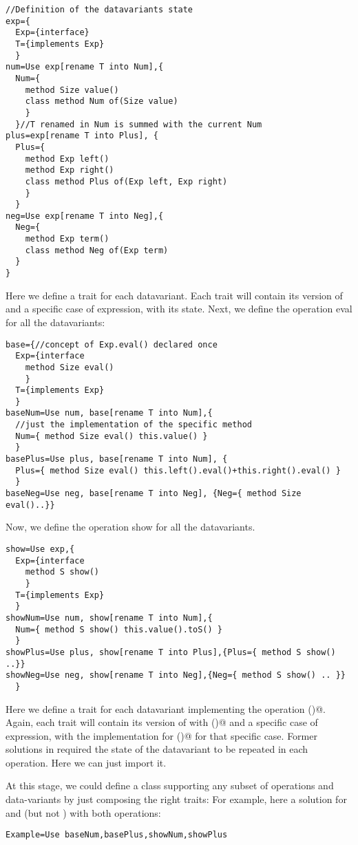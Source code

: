 \begin{lstlisting}
//Definition of the datavariants state
exp={
  Exp={interface}
  T={implements Exp}
  }
num=Use exp[rename T into Num],{
  Num={
    method Size value()
    class method Num of(Size value)
    }
  }//T renamed in Num is summed with the current Num
plus=exp[rename T into Plus], {
  Plus={
    method Exp left()
    method Exp right()
    class method Plus of(Exp left, Exp right)
    }
  }
neg=Use exp[rename T into Neg],{
  Neg={
    method Exp term()
    class method Neg of(Exp term)
  }
}
\end{lstlisting}
Here we define a trait for each datavariant.
Each trait will contain its version of \Q@Exp@
and a specific case of expression, with its state.
Next, we define the operation eval for all the datavariants:
\begin{lstlisting}
base={//concept of Exp.eval() declared once
  Exp={interface
    method Size eval()
    }
  T={implements Exp}
  }
baseNum=Use num, base[rename T into Num],{
  //just the implementation of the specific method
  Num={ method Size eval() this.value() }
  }
basePlus=Use plus, base[rename T into Num], {
  Plus={ method Size eval() this.left().eval()+this.right().eval() }
  }
baseNeg=Use neg, base[rename T into Neg], {Neg={ method Size eval()..}}
\end{lstlisting}
Now, we define the operation show for all the datavariants.
\begin{lstlisting}
show=Use exp,{
  Exp={interface
    method S show()
    }
  T={implements Exp}
  }
showNum=Use num, show[rename T into Num],{
  Num={ method S show() this.value().toS() }
  }
showPlus=Use plus, show[rename T into Plus],{Plus={ method S show() ..}}
showNeg=Use neg, show[rename T into Neg],{Neg={ method S show() .. }}
  }
\end{lstlisting}
Here we define a trait for each datavariant implementing the operation \Q@show()@.
Again, each trait will contain its version of \Q@Exp@ with \Q@show()@
and a specific case of expression, with the implementation for \Q@show()@
for that specific case.
Former solutions in \cite{deepfjig} required the state of the 
datavariant to be repeated in each operation.
Here we can just import it.


At this stage, we could define a class supporting any subset of operations
and data-variants by just composing the right traits:
For example, here a solution for \Q@Num@ and \Q@Plus@ (but not \Q@Neg@)
with both operations:
\begin{lstlisting}
Example=Use baseNum,basePlus,showNum,showPlus
\end{lstlisting}


